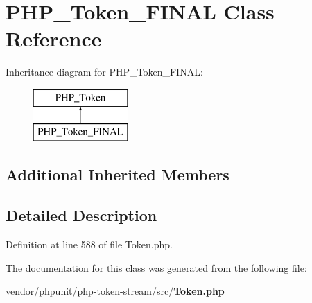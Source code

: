 \section{P\+H\+P\+\_\+\+Token\+\_\+\+F\+I\+N\+A\+L Class Reference}
\label{class_p_h_p___token___f_i_n_a_l}
Inheritance diagram for P\+H\+P\+\_\+\+Token\+\_\+\+F\+I\+N\+A\+L\+:\begin{figure}[H]
\begin{center}
\leavevmode
\includegraphics[height=2.000000cm]{class_p_h_p___token___f_i_n_a_l}
\end{center}
\end{figure}
\subsection*{Additional Inherited Members}


\subsection{Detailed Description}


Definition at line 588 of file Token.\+php.



The documentation for this class was generated from the following file\+:\begin{DoxyCompactItemize}
\item 
vendor/phpunit/php-\/token-\/stream/src/{\bf Token.\+php}\end{DoxyCompactItemize}
